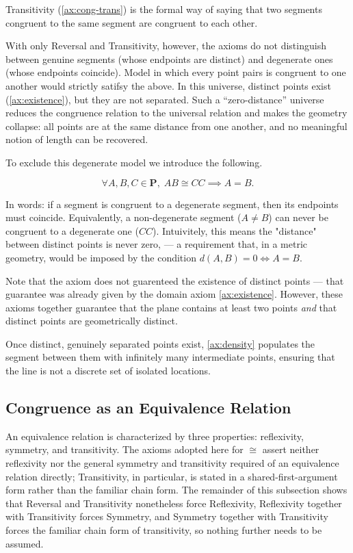 \documentclass[../../../main/main.tex]{subfiles}
\begin{document}
Transitivity (\autoref{ax:cong-trans}) is the formal way of saying that two segments congruent to the same segment are congruent to each other.

With only Reversal and Transitivity, however, the axioms do not distinguish between genuine segments (whose endpoints are distinct) and degenerate ones (whose endpoints coincide). Model in which every point pairs is congruent to one another would strictly satifsy the above. In this universe, distinct points exist (\autoref{ax:existence}), but they are not separated. Such a ``zero-distance'' universe reduces the congruence relation to the universal relation and makes the geometry collapse: all points are at the same distance from one another, and no meaningful notion of length can be recovered.

To exclude this degenerate model we introduce the following.

\begin{axiom}\label{ax:cong-identity}
    \[
    \forall A, B, C \in \mathbf{P},\; AB \cong CC \implies A = B.
    \]
\end{axiom}

\noindent
In words: if a segment is congruent to a degenerate segment, then its endpoints must coincide. Equivalently, a non-degenerate segment ($A \neq B$) can never be congruent to a degenerate one ($CC$). Intuivitely, this means the "distance" between distinct points is never zero, --- a requirement that, in a metric geometry, would be imposed by the condition $d(A,B)=0 \iff A=B$.

Note that the axiom does not guarenteed the existence of distinct points --- that guarantee was already given by the domain axiom \autoref{ax:existence}. However, these axioms together guarantee that the plane contains at least two points \emph{and} that distinct points are geometrically distinct.

Once distinct, genuinely separated points exist, \autoref{ax:density} populates the segment between them with infinitely many intermediate points, ensuring that the line is not a discrete set of isolated locations.

\subsection{Congruence as an Equivalence Relation}

An equivalence relation is characterized by three properties: reflexivity, symmetry, and transitivity. The axioms adopted here for $\cong$ assert neither reflexivity nor the general symmetry and transitivity required of an equivalence relation directly; Transitivity, in particular, is stated in a shared-first-argument form rather than the familiar chain form. The remainder of this subsection shows that Reversal and Transitivity nonetheless force Reflexivity, Reflexivity together with Transitivity forces Symmetry, and Symmetry together with Transitivity forces the familiar chain form of transitivity, so nothing further needs to be assumed.
\end{document}
